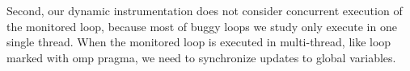 Second, our dynamic instrumentation does not consider concurrent execution of the monitored loop, 
because most of buggy loops we study only execute in one single thread. 
When the monitored loop is executed in multi-thread, like loop marked with omp pragma, we need to synchronize updates to global variables. 
